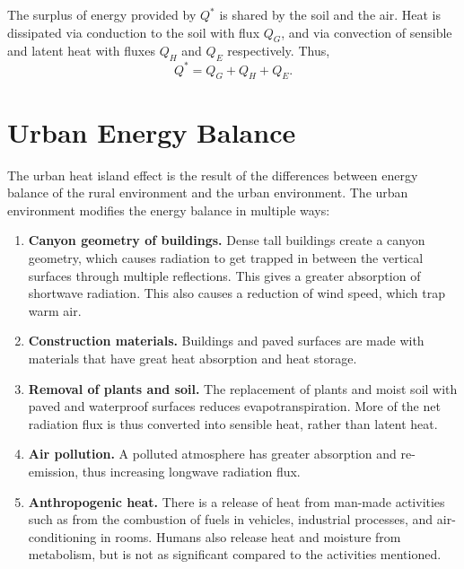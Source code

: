 	The surplus of energy provided by $Q^*$ is shared by the soil and the air.
	Heat is dissipated via conduction to the soil with flux $Q_G$,
		and via convection of sensible and latent heat with fluxes $Q_H$ and $Q_E$ respectively. 
	Thus,
	\begin{equation}
		Q^* = Q_G + Q_H + Q_E.
	\end{equation}

\section{Urban Energy Balance}
	The urban heat island effect is the result of the differences between energy balance of the rural environment and the urban environment.
	The urban environment modifies the energy balance in multiple ways:
	\begin{enumerate}
		\item \textbf{Canyon geometry of buildings.}
		Dense tall buildings create a canyon geometry,
			which causes radiation to get trapped in between the vertical surfaces through multiple reflections.
		This gives a greater absorption of shortwave radiation.
		This also causes a reduction of wind speed, which trap warm air.
		
		\item \textbf{Construction materials.}
		Buildings and paved surfaces are made with materials that have great heat absorption and heat storage.
		
		\item \textbf{Removal of plants and soil.}
		The replacement of plants and moist soil with paved and waterproof surfaces reduces evapotranspiration.
		More of the net radiation flux is thus converted into sensible heat, rather than latent heat.
		
		\item \textbf{Air pollution.}
		A polluted atmosphere has greater absorption and re-emission, thus increasing longwave radiation flux.
		
		\item \textbf{Anthropogenic heat.}
		There is a release of heat from man-made activities such as from
			the combustion of fuels in vehicles,
			industrial processes, and
			air-conditioning in rooms.
		Humans also release heat and moisture from metabolism, but is not as significant compared to the activities mentioned.
	\end{enumerate}

